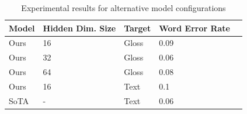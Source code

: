 \begin{table}
  \caption{Experimental results for alternative model configurations}
  \label{tab:results}
  \centering
  \begin{tabular}{lllll}
    \toprule
    Model & Hidden Dim. Size & Target & Word Error Rate \\
    \midrule
    Ours & 16  & Gloss & 0.09  \\
    Ours & 32  & Gloss & 0.06  \\
    Ours & 64  & Gloss & 0.08  \\
    Ours & 16  & Text  & 0.1   \\
    \midrule
    SoTA & -   & Text  & 0.06  \\
    \bottomrule
  \end{tabular}
\end{table}
